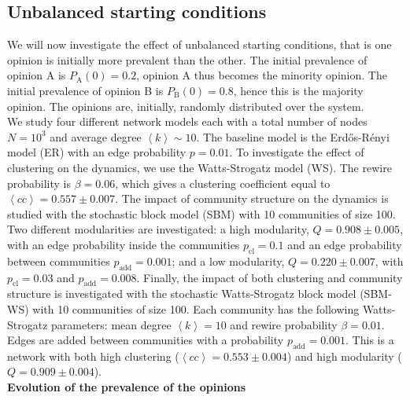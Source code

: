 \documentclass[11 pt , letterpaper , twoside , openright]{book}
\begin{document}
\subsection{Unbalanced starting conditions}\label{20-80}

We will now investigate the effect of unbalanced starting conditions, that is one opinion is initially more prevalent than the other. The initial prevalence of opinion A is $P_\text{A}(0) = 0.2$, opinion A thus becomes the minority opinion. The initial prevalence of opinion B is $P_\text{B}(0) = 0.8$, hence this is the majority opinion. The opinions are, initially, randomly distributed over the system.\\ %
\newline
We study four different network models each with a total number of nodes $N = 10^3$ and average degree $\left<k\right> \sim 10$. The baseline model is the Erd\H{o}s-R\'{e}nyi model (ER) with an edge probability $p = 0.01$. To investigate the effect of clustering on the dynamics, we use the Watts-Strogatz model (WS). The rewire probability is $\beta = 0.06$, which gives a clustering coefficient equal to $\left<cc\right> = 0.557 \pm 0.007$. The impact of community structure on the dynamics is studied with the stochastic block model (SBM) with 10 communities of size 100. Two different modularities are investigated: a high modularity, $Q = 0.908 \pm 0.005$, with an edge probability inside the communities $p_{\text{cl}} = 0.1$ and an edge probability between communities $p_{\text{add}} = 0.001$; and a low modularity, $Q = 0.220 \pm 0.007$, with $p_{\text{cl}} = 0.03$ and $p_{\text{add}} = 0.008$. Finally, the impact of both clustering and community structure is investigated with the stochastic Watts-Strogatz block model (SBM-WS) with 10 communities of size 100. Each community has the following Watts-Strogatz parameters: mean degree $\left<k\right> =10$ and rewire probability $\beta = 0.01$. Edges are added between communities with a probability $p_{\text{add}} = 0.001$. This is a network with both high clustering ($\left<cc\right> = 0.553 \pm 0.004$) and high modularity ($Q = 0.909 \pm 0.004$).\\
\newline
\textbf{Evolution of the prevalence of the opinions}\\
\end{document}
